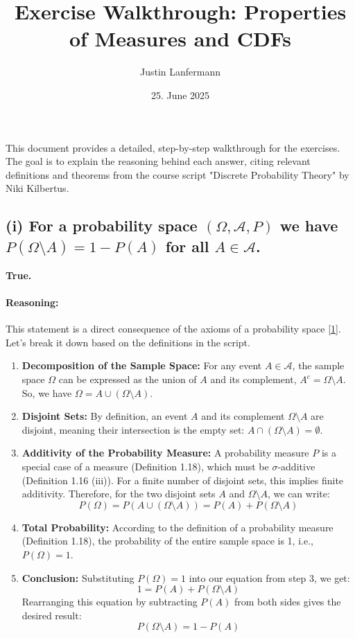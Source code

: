 \documentclass[11pt,a4paper]{article}
\author{Justin Lanfermann}
\title{Exercise Walkthrough: Properties of Measures and CDFs}
\date{25. June 2025}
\begin{document}
\maketitle

This document provides a detailed, step-by-step walkthrough for the exercises. The goal is to explain the reasoning behind each answer, citing relevant definitions and theorems from the course script "Discrete Probability Theory" by Niki Kilbertus.

\subsection*{(i) For a probability space $(\Omega, \mathcal{A}, P)$ we have $P(\Omega \setminus A) = 1 - P(A)$ for all $A \in \mathcal{A}$.}

\textbf{True.}

\paragraph{Reasoning:}
This statement is a direct consequence of the axioms of a probability space \hyperlink{note1}{[1]}. Let's break it down based on the definitions in the script.

\begin{enumerate}
    \item \textbf{Decomposition of the Sample Space:} For any event $A \in \mathcal{A}$, the sample space $\Omega$ can be expressed as the union of $A$ and its complement, $A^c = \Omega \setminus A$. So, we have $\Omega = A \cup (\Omega \setminus A)$.

    \item \textbf{Disjoint Sets:} By definition, an event $A$ and its complement $\Omega \setminus A$ are disjoint, meaning their intersection is the empty set: $A \cap (\Omega \setminus A) = \emptyset$.

    \item \textbf{Additivity of the Probability Measure:} A probability measure $P$ is a special case of a measure (Definition 1.18), which must be $\sigma$-additive (Definition 1.16 (iii)). For a finite number of disjoint sets, this implies finite additivity. Therefore, for the two disjoint sets $A$ and $\Omega \setminus A$, we can write:
    \[
        P(\Omega) = P(A \cup (\Omega \setminus A)) = P(A) + P(\Omega \setminus A)
    \]

    \item \textbf{Total Probability:} According to the definition of a probability measure (Definition 1.18), the probability of the entire sample space is 1, i.e., $P(\Omega) = 1$.

    \item \textbf{Conclusion:} Substituting $P(\Omega) = 1$ into our equation from step 3, we get:
    \[
        1 = P(A) + P(\Omega \setminus A)
    \]
    Rearranging this equation by subtracting $P(A)$ from both sides gives the desired result:
    \[
        P(\Omega \setminus A) = 1 - P(A)
    \]
\end{enumerate}
\end{document}
